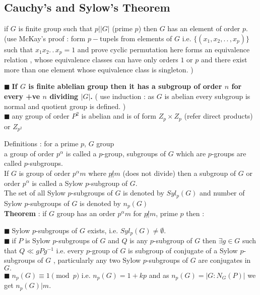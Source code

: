 \documentclass[11pt]{extarticle}
\newcommand{\ck}{.\,.\,}
\newcommand{\snote}[1]{{\footnotesize(#1)}}
\newcommand{\y}{$\blacksquare\;$}
\newcommand{\tbx}[2][]{
	\begin{tcolorbox}[enhanced,breakable,size=small,colback=black!2!white,title={#1},arc is angular, arc=1.5mm,drop fuzzy shadow]
		#2
	\end{tcolorbox}
}
\begin{document}
\begin{multicols}{2}
	
	\subsection{Cauchy's and Sylow's Theorem}
	\tbx[\textbf{Cauchy's Theorem} ]{if $ G $ is finite group such that $ p| |G| $ (prime $ p $) then $ G $ has an element of order $ p .$\\
		{ \footnotesize (use McKay's proof  : form $ p- $tupels from elements of  $ G $ i.e. $ \{(x_1,x_2,\ck,x_p) \}$ such that $ x_1x_2\ck x_p =1 $  and prove cyclic permutation here forms an equivalence relation , whose equivalence classes can have only orders $ 1 $ or $ p $ and there exist more than one element whose equivalence class is singleton. )} 
	}
	\tbx[Consequences of Cauchy's  theorem ]{
		
			\y  \textbf{If $ G $ is finite ablelian group then it has a subgroup of order $ n $ for every +ve $ n $ dividing $ |G| $.} \snote{ use induction : as $ G $ is abelian every subgroup is normal and quotient group is defined. } \\
			\y  any group of order $ P^2 $ is abelian and is of form $ Z_p \times Z_p $ \snote{refer direct products} or $ Z_{p^2} $ 
		
		
	}
	\tbx[\textbf{SYLOW'S Theorem} ]{
		{ Definitions :  for a prime $ p $, $ G $ group\\
			a group of order $ p^\alpha $ is called a $p $-group, subgroups of $ G $ which are $ p $-groups are called 
			$ p $-subgroups.\\
			If $ G $ is group of order $ p^\alpha m $ where $ p \not| m $ (does not divide) then a subgroup of $ G $ or order $ p^\alpha $ is called a Sylow $ p $-subgroup of $ G. $\\
			The set of all Sylow $ p $-subgroups of $ G $ is denoted by $ Syl_p(G) $ and number of  Sylow $ p $-subgroups of $ G $ is denoted by $ n_p(G) $}\\
		\textbf{Theorem} : if $ G $ group has an order $ p^\alpha m $ for $ p\not| m $, prime $ p $ then :
		
			\y  Sylow $ p $-subgroups of $ G $ exists, i.e. $ Syl_p(G)\neq \emptyset $. \\
			\y  if $ P $ is Sylow $ p $-subgroups of $ G $ and $ Q $ is any $ p $-subgroup of $ G $ then $ \exists g \in G $ such that $ Q\ll gPg^{-1} $ i.e. every $ p $-group of $ G $ is subgroup of conjugate of  a Sylow $ p $-subgroups of $ G $ , particularly any two Sylow $ p $-subgroups of $ G $ are conjugates in $ G. $ \\
			\y  $ n_p(G)\equiv 1 \pmod{p} $ i.e. $ n_p(G)=1+kp $ and as $ n_p(G)=|G:N_G(P)| $ we get $ n_p(G) | m .$ }
		

\end{multicols}
\end{document}
